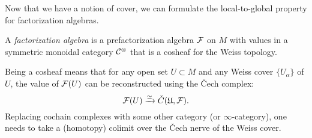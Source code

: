 \documentclass[11pt]{amsart}
\def\mcol{\, | \,}
\begin{document}
%

Now that we have a notion of cover, we can formulate the local-to-global property for factorization algebras.

\begin{dfn}
A \emph{factorization algebra} is a prefactorization algebra $\mathcal F$ on $M$ with values in a symmetric monoidal category $\mathcal C^\otimes$ that is a cosheaf for the Weiss topology.
\end{dfn}

Being a cosheaf means that for any open set $U \subset M$ and any Weiss cover $\{ U_\alpha\}$ of $U$,
the value of $\mathcal F(U)$ can be reconstructed using the \v{C}ech complex:
\[
\mathcal F(U) \xrightarrow{\simeq} \check{C}(\mathfrak{U},\mathcal F).
\]
Replacing cochain complexes with some other category (or $\infty$-category), one needs to take a (homotopy) colimit over the \v{C}ech nerve of the Weiss cover.
\end{document}
